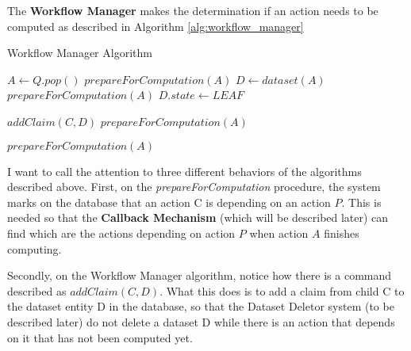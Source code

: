 The \textbf{Workflow Manager} makes the determination if an action needs to be computed as described in Algorithm \ref{alg:workflow_manager}

\begin{algorithm}
\begin{singlespace}
\caption{Workflow Manager Algorithm}
\label{alg:workflow_manager}
\begin{algorithmic}[1]
\State $A \gets Q.pop()$ 
	\State $prepareForComputation(A)$
\Else
	\State $D \gets dataset(A)$ 
		\State $prepareForComputation(A)$
	\Else
				\State $D.state \gets LEAF$ 
				
			\EndIf
			
					\State $addClaim(C, D)$ 		
						\State $prepareForComputation(A)$
					\EndIf
				\EndIf
			
			\EndFor
		\Else
				\State $prepareForComputation(A)$
			\EndIf
		\EndIf
	\EndIf
\EndIf
\EndProcedure
\end{algorithmic}
\end{singlespace}
\end{algorithm}

I want to call the attention to three different behaviors of the algorithms described above. First, on the \textit{prepareForComputation} procedure, the system marks on the database that an action C is depending on an action $P$. This is needed so that the \textbf{Callback Mechanism} (which will be described later) can find which are the actions depending on action $P$ when action $A$ finishes computing.

Secondly, on the Workflow Manager algorithm, notice how there is a command described as $addClaim(C, D)$. What this does is to add a claim from child C to the dataset entity D in the database, so that the Dataset Deletor system (to be described later) do not delete a dataset D while there is an action that depends on it that has not been computed yet.

